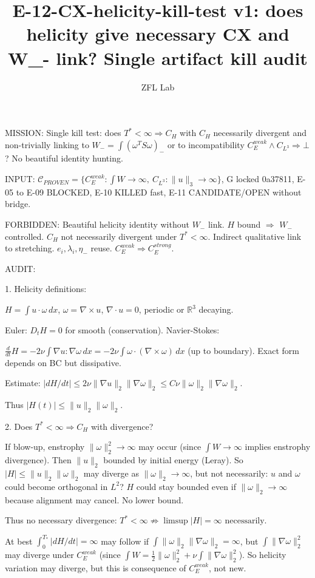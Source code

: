 \documentclass[11pt]{article}
\title{E-12-CX-helicity-kill-test v1: does helicity give necessary CX and W\_- link? Single artifact kill audit}
\author{ZFL Lab}
\begin{document}
\maketitle

MISSION: Single kill test: does $T^*<\infty\Rightarrow C_H$ with $C_H$ necessarily divergent and non-trivially linking to $W_-=\int(\omega^T S\omega)_-$ or to incompatibility $C_E^{weak}\land C_{L^3}\Rightarrow\bot$? No beautiful identity hunting.

INPUT: $\mathcal{C}_{PROVEN}=\{C_E^{weak}:\int W\to\infty,\ C_{L^3}:\|u\|_3\to\infty\}$, G locked 0a37811, E-05 to E-09 BLOCKED, E-10 KILLED fast, E-11 CANDIDATE/OPEN without bridge.

FORBIDDEN:
Beautiful helicity identity without $W_-$ link.
$H$ bound $\Rightarrow$ $W_-$ controlled.
$C_H$ not necessarily divergent under $T^*<\infty$.
Indirect qualitative link to stretching.
$e_i,\lambda_i,\eta_-$ reuse.
$C_E^{weak}\Rightarrow C_E^{strong}$.

AUDIT:

1. Helicity definitions:

$H=\int u\cdot\omega\,dx$, $\omega=\nabla\times u$, $\nabla\cdot u=0$, periodic or $\mathbb{R}^3$ decaying.

Euler: $D_t H=0$ for smooth (conservation). Navier-Stokes:

$\frac{d}{dt}H = -2\nu\int \nabla u:\nabla\omega\,dx = -2\nu\int \omega\cdot(\nabla\times\omega)\,dx$ (up to boundary). Exact form depends on BC but dissipative.

Estimate:
$|dH/dt|\le 2\nu\|\nabla u\|_2\|\nabla\omega\|_2\le C\nu\|\omega\|_2\|\nabla\omega\|_2$.

Thus $|H(t)|\le \|u\|_2\|\omega\|_2$.

2. Does $T^*<\infty\Rightarrow C_H$ with divergence?

If blow-up, enstrophy $\|\omega\|_2^2\to\infty$ may occur (since $\int W\to\infty$ implies enstrophy divergence). Then $\|u\|_2$ bounded by initial energy (Leray). So $|H|\le \|u\|_2\|\omega\|_2$ may diverge as $\|\omega\|_2\to\infty$, but not necessarily: $u$ and $\omega$ could become orthogonal in $L^2$? $H$ could stay bounded even if $\|\omega\|_2\to\infty$ because alignment may cancel. No lower bound.

Thus no necessary divergence:
$\boxed{T^*<\infty\not\Rightarrow \limsup|H|=\infty\text{ necessarily}}$.

At best $\int_0^{T_*} |dH/dt| =\infty$ may follow if $\int\|\omega\|_2\|\nabla\omega\|_2=\infty$, but $\int\|\nabla\omega\|_2^2$ may diverge under $C_E^{weak}$ (since $\int W =\frac12\|\omega\|_2^2+\nu\int\|\nabla\omega\|_2^2$). So helicity variation may diverge, but this is consequence of $C_E^{weak}$, not new.
\end{document}
